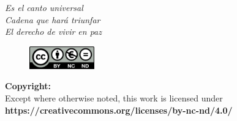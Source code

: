 \vfill
\begin{flushright}
    \vfill
	\hfill
	\emph{Es el canto universal\\Cadena que hará triunfar\\El derecho de vivir en paz}
	\vfill
\end{flushright}
\mbox{}
\vfill
\begin{figure}
    \begin{center}
        \vspace{-\baselineskip}
        \includegraphics[width=0.25\textwidth]{figures/thesis-copyright.png}
    \end{center}
\end{figure}
\noindent
\textbf{Copyright:}\\
Except where otherwise noted,
this work is licensed under\\
\textbf{https://creativecommons.org/licenses/by-nc-nd/4.0/}